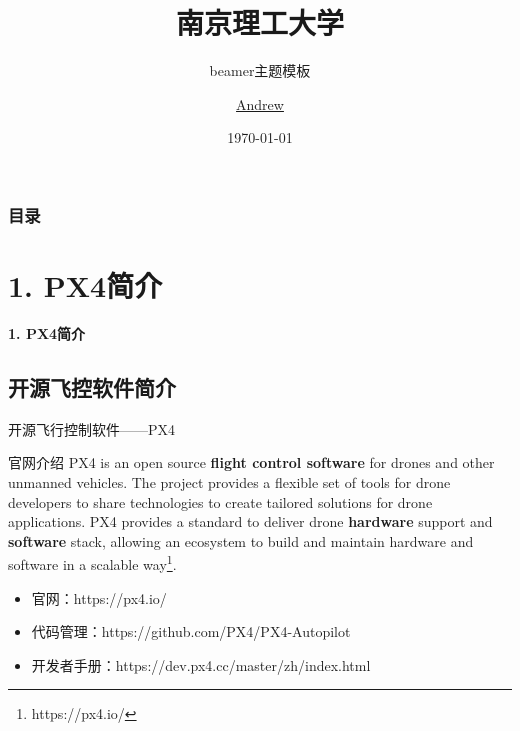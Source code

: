 \documentclass[10pt]{ctexbeamer}
\title[Tilt-quadrotor]{南京理工大学}
\subtitle{beamer主题模板}
\author[Andrew]{\href{shuai.qian.anc@gmail.com}{Andrew}}
\institute{自动化学院 \\ {\small 南京理工大学}}
\date[\today]{\today}
\begin{document}
\begin{frame}[plain]
  \maketitle
\end{frame}

\begin{frame}[t]
  \frametitle{目录}
  \tableofcontents
\end{frame}

\section{1. PX4简介}\label{sec:1}
\begin{frame}
	\thispagestyle{empty}
	\begin{center}
		{\Large\bf \color{red} 1. PX4简介}
	\end{center}
\end{frame}

\subsection{开源飞控软件简介}

\begin{frame}[t]{开源飞行控制软件——PX4}
	\begin{block}{官网介绍}
		PX4 is an open source \textbf{flight control software} for drones and other unmanned vehicles. The project provides a flexible set of tools for drone developers to share technologies to create tailored solutions for drone applications. PX4 provides a standard to deliver drone \textbf{hardware} support and \textbf{software} stack, allowing an ecosystem to build and maintain hardware and software in a scalable way\footnote{https://px4.io/}.
	\end{block}
	
	\begin{itemize}
		\item 官网：https://px4.io/
		\item 代码管理：https://github.com/PX4/PX4-Autopilot
		\item 开发者手册：https://dev.px4.cc/master/zh/index.html
	\end{itemize}
\end{frame}
\end{document}
